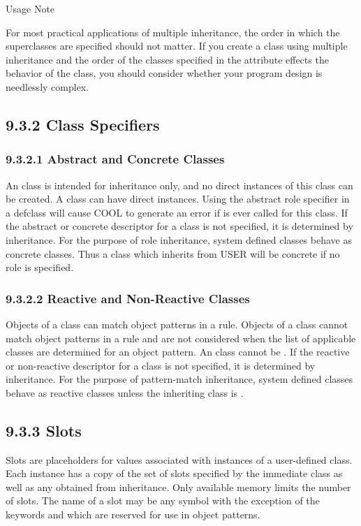 \documentclass[letterpaper,10pt,english]{sphinxmanual}
\begin{document}
Usage Note

For most practical applications of multiple inheritance, the order in
which the superclasses are specified should not matter. If you create a
class using multiple inheritance and the order of the classes specified
in the  attribute effects the behavior of the class, you should
consider whether your program design is needlessly complex.


\subsection{9.3.2 Class Specifiers}
\label{\detokenize{cool:class-specifiers}}

\subsubsection{9.3.2.1 Abstract and Concrete Classes}
\label{\detokenize{cool:abstract-and-concrete-classes}}
An  class is intended for inheritance only, and no direct
instances of this class can be created. A  class can have
direct instances. Using the abstract role specifier in a defclass will
cause COOL to generate an error if  is ever called for
this class. If the abstract or concrete descriptor for a class is not
specified, it is determined by inheritance. For the purpose of role
inheritance, system defined classes behave as concrete classes. Thus a
class which inherits from USER will be concrete if no role is specified.


\subsubsection{9.3.2.2 Reactive and Non-Reactive Classes}
\label{\detokenize{cool:reactive-and-non-reactive-classes}}
Objects of a  class can match object patterns in a rule.
Objects of a  class cannot match object patterns in a
rule and are not considered when the list of applicable classes are
determined for an object pattern. An  class cannot be
. If the reactive or non-reactive descriptor for a class is
not specified, it is determined by inheritance. For the purpose of
pattern-match inheritance, system defined classes behave as reactive
classes unless the inheriting class is .


\subsection{9.3.3 Slots}
\label{\detokenize{cool:slots}}
Slots are placeholders for values associated with instances of a
user-defined class. Each instance has a copy of the set of slots
specified by the immediate class as well as any obtained from
inheritance. Only available memory limits the number of slots. The name
of a slot may be any symbol with the exception of the keywords 
and  which are reserved for use in object patterns.
\end{document}
